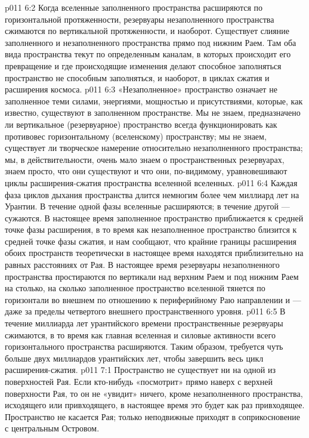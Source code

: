 \vs p011 6:2 Когда вселенные заполненного пространства расширяются по горизонтальной протяженности, резервуары незаполненного пространства сжимаются по вертикальной протяженности, и наоборот. Существует слияние заполненного и незаполненного пространства прямо под нижним Раем. Там оба вида пространства текут по определенным каналам, в которых происходит его превращение и где происходящие изменения делают способное заполняться пространство не способным заполняться, и наоборот, в циклах сжатия и расширения космоса.
\vs p011 6:3 \pc «Незаполненное» пространство означает не заполненное теми силами, энергиями, мощностью и присутствиями, которые, как известно, существуют в заполненном пространстве. Мы не знаем, предназначено ли вертикальное (резервуарное) пространство всегда функционировать как противовес горизонтальному (вселенскому) пространству; мы не знаем, существует ли творческое намерение относительно незаполненного пространства; мы, в действительности, очень мало знаем о пространственных резервуарах, знаем просто, что они существуют и что они, по\hyp{}видимому, уравновешивают циклы расширения\hyp{}сжатия пространства вселенной вселенных.
\vs p011 6:4 \pc Каждая фаза циклов дыхания пространства длится немногим более чем миллиард лет на Урантии. В течение одной фазы вселенные расширяются; в течение другой --- сужаются. В настоящее время заполненное пространство приближается к средней точке фазы расширения, в то время как незаполненное пространство близится к средней точке фазы сжатия, и нам сообщают, что крайние границы расширения обоих пространств теоретически в настоящее время находятся приблизительно на равных расстояниях от Рая. В настоящее время резервуары незаполненного пространства простираются по вертикали над верхним Раем и под нижним Раем на столько, на сколько заполненное пространство вселенной тянется по горизонтали во внешнем по отношению к периферийному Раю направлении и --- даже за пределы четвертого внешнего пространственного уровня.
\vs p011 6:5 В течение миллиарда лет урантийского времени пространственные резервуары сжимаются, в то время как главная вселенная и силовые активности всего горизонтального пространства расширяются. Таким образом, требуется чуть больше двух миллиардов урантийских лет, чтобы завершить весь цикл расширения\hyp{}сжатия.
\vs p011 7:1 Пространство не существует ни на одной из поверхностей Рая. Если кто\hyp{}нибудь «посмотрит» прямо наверх с верхней поверхности Рая, то он не «увидит» ничего, кроме незаполненного пространства, исходящего или привходящего, в настоящее время это будет как раз привходящее. Пространство не касается Рая; только неподвижные  приходят в соприкосновение с центральным Островом.
